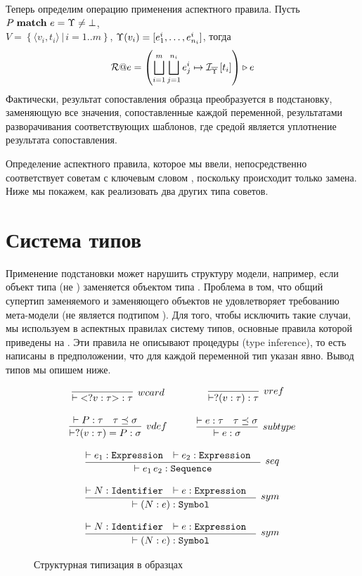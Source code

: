 Теперь определим операцию применения аспектного правила.
Пусть $P \; \mathbf{match}_{} \; e = \Upsilon \neq \bot$, \\$V = \left\{\langle v_i, t_i \rangle \,|\, i = 1..m \right\}$,  $\Upsilon(v_i) = [e^i_1, \ldots, e^i_{n_i}]$, тогда
	$$\mathcal{R}@e
		= \left( \bigsqcup\limits_{i=1}^{m} \bigsqcup\limits_{j=1}^{n_i}
			e^i_j \mapsto \mathcal{I}_{\overline{\Upsilon}} \left[ t_i \right] \right) \triangleright e$$
Фактически, результат сопоставления образца преобразуется в подстановку, заменяющую все значения, сопоставленные каждой переменной, результатами разворачивания соответствующих шаблонов, где средой является уплотнение результата сопоставления.

\begin{Note}
Определение аспектного правила, которое мы ввели, непосредственно соответствует советам с ключевым словом , поскольку происходит только замена. Ниже мы покажем, как реализовать два других типа советов.
\end{Note}


\section{Система типов}

Применение подстановки может нарушить структуру модели, например, если объект типа  (не ) заменяется объектом типа . Проблема в том, что общий супертип заменяемого и заменяющего объектов не удовлетворяет требованию мета-модели (не является подтипом ). Для того, чтобы исключить такие случаи, мы используем в аспектных правилах систему типов, основные правила которой приведены на . Эти правила не описывают процедуры  (type inference), то есть написаны в предположении, что для каждой переменной тип указан явно. Вывод типов мы опишем ниже.
\begin{figure}[htbp]
	\centering
$$
\begin{array}{ccc}
	\infer[wcard]{ \vdash \wcard{?v}{\tau} : \tau}{}
	&\quad&
	\infer[vref]{ \vdash ?(v : \tau) : \tau}{}\\
	&&\,\\
	\infer[vdef]{ \vdash ?(v : \tau) = P : \sigma}{
		 \vdash P : \tau & \tau \preceq \sigma	
	}
	&&
	\infer[subtype]{ \vdash e : \sigma}{
		 \vdash e : \tau & \tau \preceq \sigma	
	}\\
	&&\,\\
	\multicolumn{3}{c}{
	\infer[seq]{ \vdash e_1 \, e_2 : \mathtt{Sequence}}{
		 \vdash e_1 : \mathtt{Expression} & 
		 \vdash e_2 : \mathtt{Expression} & 
	}}\\
	&&\,\\
	\multicolumn{3}{c}{
	\infer[sym]{ \vdash (N : e) : \mathtt{Symbol}}{
		 \vdash N : \mathtt{Identifier} & 
		 \vdash e : \mathtt{Expression} & 
	}}\\
	\,\\
	\multicolumn{3}{c}{
	\infer[sym]{ \vdash (N : e) : \mathtt{Symbol}}{
		 \vdash N : \mathtt{Identifier} & 
		 \vdash e : \mathtt{Expression} & 
	}}\\
\end{array}
$$
	\caption{Структурная типизация в образцах}\label{AspTypes}
\end{figure}

